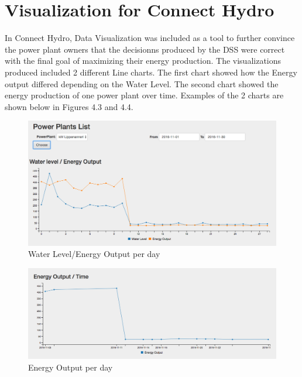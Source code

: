 \section{Visualization for Connect Hydro}
In Connect Hydro, Data Visualization was included as a tool to further convince the power plant owners that the decisionns produced by the DSS were correct with the final goal of maximizing their energy production. The visualizations produced included 2 different Line charts. The first chart showed how the Energy output differed depending on the Water Level. The second chart showed the energy production of one power plant over time. Examples of the 2 charts are shown below in Figures 4.3 and 4.4.
\begin{figure}[H]
\centering
\includegraphics[scale=0.4]{Images/Chart1.png}
\caption[Water Level/Energy Output per day]{Water Level/Energy Output per day}
\end{figure}
\begin{figure}[H]
\centering
\includegraphics[scale=0.4]{Images/Chart2.png}
\caption[Energy Output per day]{Energy Output per day}
\end{figure}
